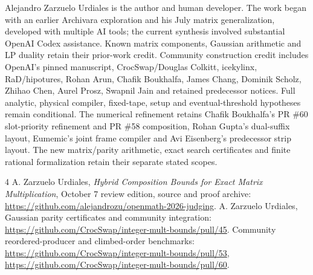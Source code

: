 \documentclass[11pt]{article}
\begin{document}
Alejandro Zarzuelo Urdiales is the author and human developer. The work
began with an earlier Archivara exploration and his July matrix
generalization, developed with multiple AI tools; the current synthesis
involved substantial OpenAI Codex assistance. Known matrix components,
Gaussian arithmetic and LP duality retain their prior-work credit.
Community construction credit includes OpenAI's pinned manuscript,
CrocSwap/Douglas Colkitt, icekylinx, RaD/hipotures, Rohan Arun, Chafik
Boukhalfa, James Chang, Dominik Scholz, Zhihao Chen, Aurel Prosz, Swapnil
Jain and retained predecessor notices. Full analytic, physical compiler,
fixed-tape, setup and eventual-threshold hypotheses remain conditional.
The numerical refinement retains Chafik Boukhalfa's PR \#60 slot-priority refinement and
PR \#58 composition, Rohan Gupta's
dual-suffix layout, Eumemic's joint frame compiler and Avi Eisenberg's
predecessor strip layout. The new matrix/parity arithmetic,
exact search certificates and finite rational formalization retain their
separate stated scopes.

\begin{thebibliography}{4}
 A. Zarzuelo Urdiales, \emph{Hybrid Composition Bounds for
Exact Matrix Multiplication}, October 7 review edition, source and proof
archive: \url{https://github.com/alejandrozu/openmath-2026-judging}.
 A. Zarzuelo Urdiales, Gaussian parity certificates and
community integration: \url{https://github.com/CrocSwap/integer-mult-bounds/pull/45}.
 Community reordered-producer and climbed-order
benchmarks: \url{https://github.com/CrocSwap/integer-mult-bounds/pull/53},
\url{https://github.com/CrocSwap/integer-mult-bounds/pull/60}.
\end{thebibliography}
\end{document}
